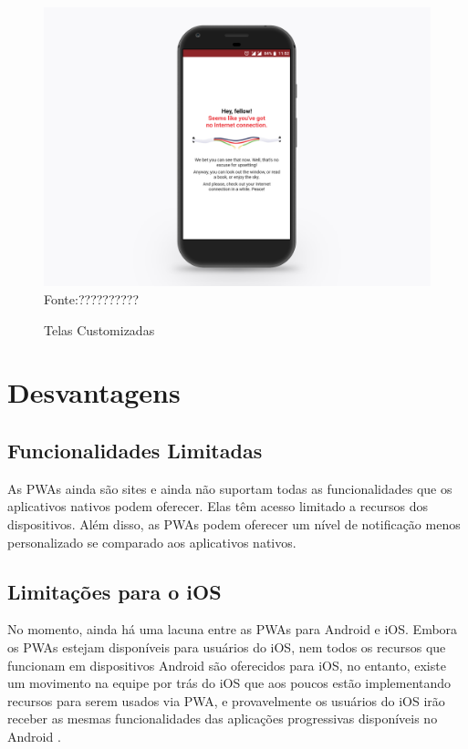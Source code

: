 \newpage
\begin{figure}[!htpb]
	\centering
	\caption{Telas Customizadas}
	\includegraphics[width=13cm]{images/pwa_custom.png}\\
	Fonte:??????????
 	\label{f_c4_pwa_custom}
\end{figure}

\section{Desvantagens}
\subsection{Funcionalidades Limitadas}
As \ac{PWA}s ainda são sites e ainda não suportam todas as funcionalidades que os aplicativos nativos podem oferecer. Elas têm acesso limitado a recursos dos dispositivos. Além disso, as \ac{PWA}s podem oferecer um nível de notificação menos personalizado se comparado aos aplicativos nativos.

\subsection{Limitações para o iOS}
No momento, ainda há uma lacuna entre as \ac{PWA}s para Android e iOS. Embora os PWAs estejam disponíveis para usuários do iOS, nem todos os recursos que funcionam em dispositivos Android são oferecidos para iOS, no entanto, existe um movimento na equipe por trás do iOS que aos poucos estão implementando recursos para serem usados via \ac{PWA}, e provavelmente os usuários do iOS irão receber as mesmas funcionalidades das aplicações progressivas disponíveis no Android \cite{pwaios}.